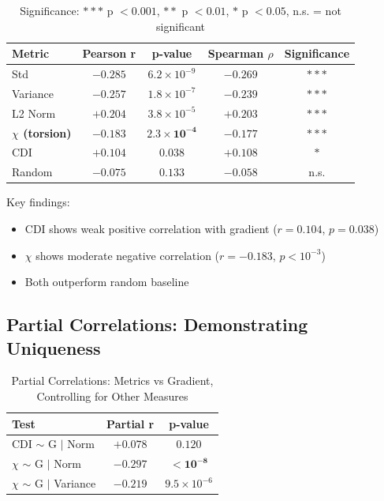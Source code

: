 \documentclass[11pt]{article}
\begin{document}
\begin{table}[htbp]
	\centering
	\caption{Correlation of Metrics with Cortical Gradient ($n = 400$)}
	\label{tab:correlations}
	\begin{tabular}{lcccc}
		\toprule
		\textbf{Metric}           & \textbf{Pearson r} & \textbf{p-value}              & \textbf{Spearman $\rho$} & \textbf{Significance} \\
		\midrule
		Std                       & $-0.285$           & $6.2 \times 10^{-9}$          & $-0.269$                 & $* * *$               \\
		Variance                  & $-0.257$           & $1.8 \times 10^{-7}$          & $-0.239$                 & $* * *$               \\
		L2 Norm                   & $+0.204$           & $3.8 \times 10^{-5}$          & $+0.203$                 & $* * *$               \\
		\textbf{$\chi$ (torsion)} & $\mathbf{-0.183}$  & $\mathbf{2.3 \times 10^{-4}}$ & $-0.177$                 & $* * *$               \\
		CDI                       & $+0.104$           & $0.038$                       & $+0.108$                 & $*$                   \\
		Random                    & $-0.075$           & $0.133$                       & $-0.058$                 & n.s.                  \\
		\bottomrule
	\end{tabular}
	\caption*{\small Significance: $* * *$ p $< 0.001$, $* *$ p $< 0.01$, $*$ p $< 0.05$, n.s. = not significant}
\end{table}

Key findings:
\begin{itemize}
	\item CDI shows weak positive correlation with gradient ($r = 0.104$, $p = 0.038$)
	\item $\chi$ shows moderate negative correlation ($r = -0.183$, $p < 10^{-3}$)
	\item Both outperform random baseline
\end{itemize}

\subsection{Partial Correlations: Demonstrating Uniqueness}

\begin{table}[htbp]
	\centering
	\caption{Partial Correlations: Metrics vs Gradient, Controlling for Other Measures}
	\label{tab:partial}
	\begin{tabular}{lcc}
		\toprule
		\textbf{Test}                & \textbf{Partial r} & \textbf{p-value}     \\
		\midrule
		CDI $\sim$ G $|$ Norm        & $+0.078$           & $0.120$              \\
		$\chi$ $\sim$ G $|$ Norm     & $\mathbf{-0.297}$  & $\mathbf{< 10^{-8}}$ \\
		$\chi$ $\sim$ G $|$ Variance & $-0.219$           & $9.5 \times 10^{-6}$ \\
		\bottomrule
	\end{tabular}
\end{table}
\end{document}
